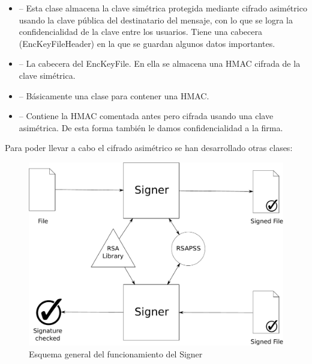 \begin{itemize}
  \item {} -- Esta clase almacena la clave simétrica protegida
  mediante cifrado asimétrico usando la clave pública del destinatario del
  mensaje, con lo que se logra la confidencialidad de la clave entre los
  usuarios. Tiene una cabecera (EncKeyFileHeader) en la que se guardan algunos
  datos importantes.

  \item {} -- La cabecera del EncKeyFile. En ella se
  almacena una HMAC cifrada de la clave simétrica.

  \item {} -- Básicamente una clase para contener una HMAC.

  \item {} -- Contiene la HMAC comentada antes pero
  cifrada usando una clave asimétrica. De esta forma también le damos
  confidencialidad a la firma.
\end{itemize}

Para poder llevar a cabo el cifrado asimétrico se han desarrollado otras clases:

\begin{figure}[ht]
  \centering
  \includegraphics[scale=0.4]{Figures/Signer}
  \decoRule
  \caption[Signer]{Esquema general del funcionamiento del Signer}
  \label{fig:Signer}
\end{figure}

